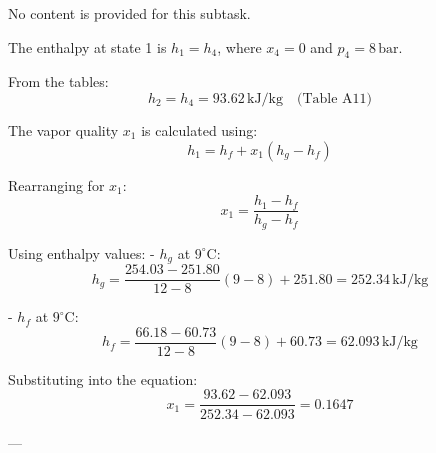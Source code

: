 No content is provided for this subtask.

The enthalpy at state 1 is \( h_1 = h_4 \), where \( x_4 = 0 \) and \( p_4 = 8 \, \text{bar} \).  

From the tables:  
\[
h_2 = h_4 = 93.62 \, \text{kJ/kg} \quad \text{(Table A11)}
\]  

The vapor quality \( x_1 \) is calculated using:  
\[
h_1 = h_f + x_1 (h_g - h_f)
\]  

Rearranging for \( x_1 \):  
\[
x_1 = \frac{h_1 - h_f}{h_g - h_f}
\]  

Using enthalpy values:  
- \( h_g \) at \( 9^\circ\text{C} \):  
\[
h_g = \frac{254.03 - 251.80}{12 - 8} (9 - 8) + 251.80 = 252.34 \, \text{kJ/kg}
\]  

- \( h_f \) at \( 9^\circ\text{C} \):  
\[
h_f = \frac{66.18 - 60.73}{12 - 8} (9 - 8) + 60.73 = 62.093 \, \text{kJ/kg}
\]  

Substituting into the equation:  
\[
x_1 = \frac{93.62 - 62.093}{252.34 - 62.093} = 0.1647
\]  

---